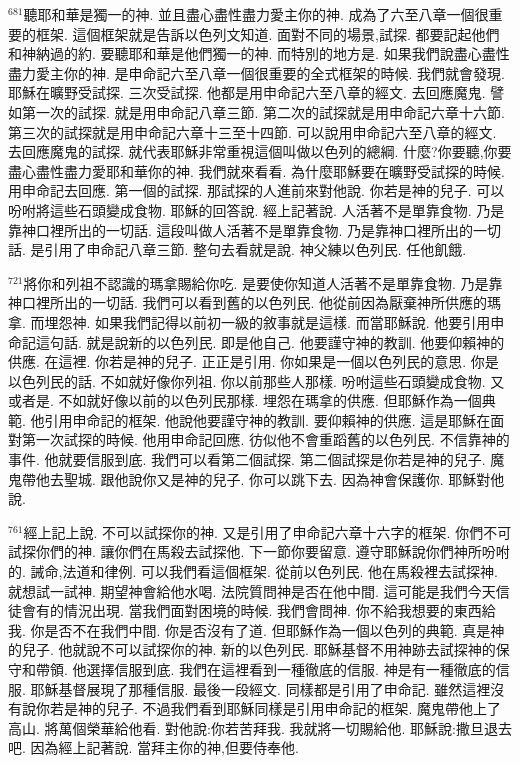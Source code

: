 \documentclass{book}
\begin{document}
$^{681}$聽耶和華是獨一的神.
並且盡心盡性盡力愛主你的神.
成為了六至八章一個很重要的框架.
這個框架就是告訴以色列文知道.
面對不同的場景,試探.
都要記起他們和神納過的約.
要聽耶和華是他們獨一的神.
而特別的地方是.
如果我們說盡心盡性盡力愛主你的神.
是申命記六至八章一個很重要的全式框架的時候.
我們就會發現.
耶穌在曠野受試探.
三次受試探.
他都是用申命記六至八章的經文.
去回應魔鬼.
譬如第一次的試探.
就是用申命記八章三節.
第二次的試探就是用申命記六章十六節.
第三次的試探就是用申命記六章十三至十四節.
可以說用申命記六至八章的經文.
去回應魔鬼的試探.
就代表耶穌非常重視這個叫做以色列的總綱.
什麼?你要聽,你要盡心盡性盡力愛耶和華你的神.
我們就來看看.
為什麼耶穌要在曠野受試探的時候.
用申命記去回應.
第一個的試探.
那試探的人進前來對他說.
你若是神的兒子.
可以吩咐將這些石頭變成食物.
耶穌的回答說.
經上記著說.
人活著不是單靠食物.
乃是靠神口裡所出的一切話.
這段叫做人活著不是單靠食物.
乃是靠神口裡所出的一切話.
是引用了申命記八章三節.
整句去看就是說.
神父練以色列民.
任他飢餓.

$^{721}$將你和列祖不認識的瑪拿賜給你吃.
是要使你知道人活著不是單靠食物.
乃是靠神口裡所出的一切話.
我們可以看到舊的以色列民.
他從前因為厭棄神所供應的瑪拿.
而埋怨神.
如果我們記得以前初一級的敘事就是這樣.
而當耶穌說.
他要引用申命記這句話.
就是說新的以色列民.
即是他自己.
他要謹守神的教訓.
他要仰賴神的供應.
在這裡.
你若是神的兒子.
正正是引用.
你如果是一個以色列民的意思.
你是以色列民的話.
不如就好像你列祖.
你以前那些人那樣.
吩咐這些石頭變成食物.
又或者是.
不如就好像以前的以色列民那樣.
埋怨在瑪拿的供應.
但耶穌作為一個典範.
他引用申命記的框架.
他說他要謹守神的教訓.
要仰賴神的供應.
這是耶穌在面對第一次試探的時候.
他用申命記回應.
彷似他不會重蹈舊的以色列民.
不信靠神的事件.
他就要信服到底.
我們可以看第二個試探.
第二個試探是你若是神的兒子.
魔鬼帶他去聖城.
跟他說你又是神的兒子.
你可以跳下去.
因為神會保護你.
耶穌對他說.

$^{761}$經上記上說.
不可以試探你的神.
又是引用了申命記六章十六字的框架.
你們不可試探你們的神.
讓你們在馬殺去試探他.
下一節你要留意.
遵守耶穌說你們神所吩咐的.
誡命,法道和律例.
可以我們看這個框架.
從前以色列民.
他在馬殺裡去試探神.
就想試一試神.
期望神會給他水喝.
法院質問神是否在他中間.
這可能是我們今天信徒會有的情況出現.
當我們面對困境的時候.
我們會問神.
你不給我想要的東西給我.
你是否不在我們中間.
你是否沒有了道.
但耶穌作為一個以色列的典範.
真是神的兒子.
他就說不可以試探你的神.
新的以色列民.
耶穌基督不用神跡去試探神的保守和帶領.
他選擇信服到底.
我們在這裡看到一種徹底的信服.
神是有一種徹底的信服.
耶穌基督展現了那種信服.
最後一段經文.
同樣都是引用了申命記.
雖然這裡沒有說你若是神的兒子.
不過我們看到耶穌同樣是引用申命記的框架.
魔鬼帶他上了高山.
將萬個榮華給他看.
對他說:你若苦拜我.
我就將一切賜給他.
耶穌說:撒旦退去吧.
因為經上記著說.
當拜主你的神,但要侍奉他.
\end{document}
